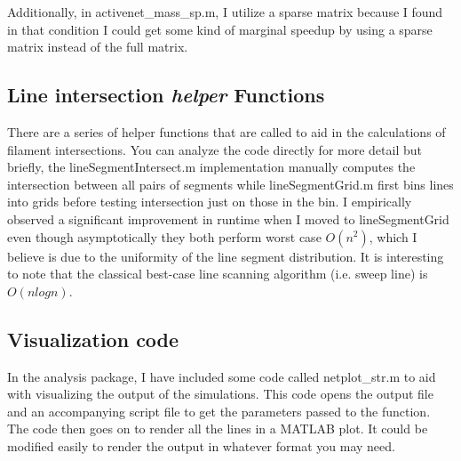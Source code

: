 Additionally, in activenet\_mass\_sp.m, I utilize a sparse matrix because I found in that condition I could get some kind of marginal speedup by using a sparse matrix instead of the full matrix.


\subsection{Line intersection \textit{helper} Functions}
There are a series of helper functions that are called to aid in the calculations of filament intersections.  You can analyze the code directly for more detail but briefly, the lineSegmentIntersect.m implementation manually computes the intersection between all pairs of segments while lineSegmentGrid.m first bins lines into grids before testing intersection just on those in the bin.  I empirically observed a significant improvement in runtime when I moved to lineSegmentGrid even though asymptotically they both perform worst case $O(n^2)$, which I believe is due to the uniformity of the line segment distribution.  It is interesting to note that the classical best-case line scanning algorithm (i.e. sweep line) is $O(nlogn)$.

\subsection{Visualization code}
In the analysis package, I have included some code called netplot\_str.m to aid with visualizing the output of the simulations.  This code opens the output file and an accompanying script file to get the parameters passed to the function.  The code then goes on to render all the lines in a MATLAB plot.  It could be modified easily to render the output in whatever format you may need.  